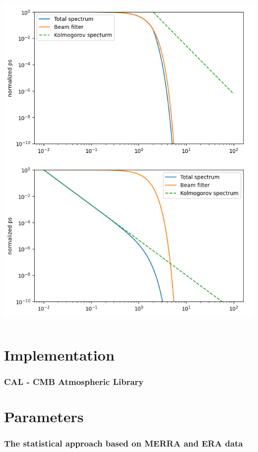 \documentclass[aspectratio=169]{beamer}
\begin{document}
\begin{frame}
\begin{columns}
\begin{column}{0.5\textwidth}
            \includegraphics[scale=0.35]{Figure_1.png}
        \end{column}

    \end{columns}

\end{frame}

\section{Implementation}
\begin{frame}
    \frametitle{CAL - CMB Atmospheric Library }
\end{frame}

\section{Parameters}
\begin{frame}
    \frametitle{The statistical approach based on MERRA and ERA data}
\end{frame}
\end{document}
